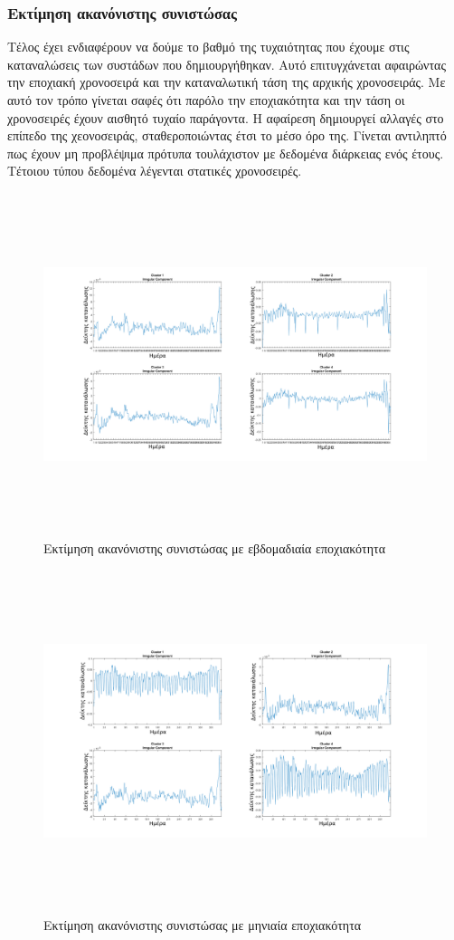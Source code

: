 \subsubsection{Εκτίμηση ακανόνιστης συνιστώσας}
Τέλος έχει ενδιαφέρουν να δούμε το βαθμό της τυχαιότητας που έχουμε στις καταναλώσεις των συστάδων που δημιουργήθηκαν. Αυτό επιτυγχάνεται αφαιρώντας την εποχιακή χρονοσειρά και την καταναλωτική τάση της αρχικής χρονοσειράς. Με αυτό τον τρόπο γίνεται σαφές ότι παρόλο την εποχιακότητα και την τάση οι χρονοσειρές έχουν αισθητό τυχαίο παράγοντα. Η αφαίρεση δημιουργεί αλλαγές στο επίπεδο της χεονοσειράς, σταθεροποιώντας έτσι το μέσο όρο της. Γίνεται αντιληπτό πως έχουν μη προβλέψιμα πρότυπα  τουλάχιστον με δεδομένα διάρκειας ενός έτους. Τέτοιου τύπου δεδομένα λέγενται στατικές χρονοσειρές.\cite{stationarity}
\begin{figure}[ht!]
\centering
\includegraphics[width=180mm, height=100mm]{../../plots/Trend_estimation/irregular_component_all.png}
\caption{Εκτίμηση ακανόνιστης συνιστώσας με εβδομαδιαία εποχιακότητα}
\label{fig:irregular week}
\end{figure}

\newpage
\begin{figure}[ht!]
\centering
\includegraphics[width=180mm, height=100mm]{../../plots/Trend_estimation/irregular_component_month_all.png}
\caption{Εκτίμηση ακανόνιστης συνιστώσας με μηνιαία εποχιακότητα}
\label{fig:irregular month}
\end{figure}
